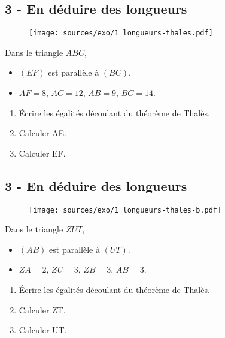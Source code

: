 \documentclass[11pt]{article}
\begin{document}

\setlength{\columnseprule}{1pt}

\subsection*{3 - En déduire des longueurs}

\begin{multicols}{2}

\begin{figure}[H]
  \centering
  \texttt{[image: sources/exo/1\_longueurs-thales.pdf]}
\end{figure}

Dans le triangle $ABC$, 

\begin{itemize}
\item $(EF)$ est parallèle à $(BC)$.
\item $AF = 8$, $AC = 12$, $AB = 9$, $BC = 14$.
\end{itemize}

\begin{enumerate}
\item Écrire les égalités découlant du théorème de Thalès.
\item Calculer AE.
\item Calculer EF.
\end{enumerate}

\end{multicols}

\vspace{1cm}

\subsection*{3 - En déduire des longueurs}

\begin{multicols}{2}

\begin{figure}[H]
  \centering
  \texttt{[image: sources/exo/1\_longueurs-thales-b.pdf]}
\end{figure}

Dans le triangle $ZUT$, 

\begin{itemize}
\item $(AB)$ est parallèle à $(UT)$.
\item $ZA = 2$, $ZU = 3$, $ZB = 3$, $AB = 3$.
\end{itemize}

\begin{enumerate}
\item Écrire les égalités découlant du théorème de Thalès.
\item Calculer ZT.
\item Calculer UT.
\end{enumerate}

\end{multicols}
\end{document}
